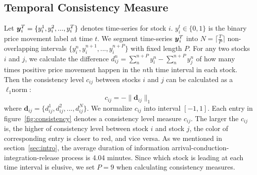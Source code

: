 \documentclass[sigconf,anonymous,review]{acmart}
\begin{document}
\subsection{Temporal Consistency Measure}

Let ${\boldsymbol{y}}_i^T=\{y_i^1,y_i^2,...,y_i^T\}$ denotes time-series for
stock $i$. $y_i^t\in \{0,1\}$ is the binary price movement label
at time $t$. We segment time-series ${\boldsymbol{y}}_i^T$ into
$N=\lceil\frac{T}{P}\rceil$ non-overlapping intervals
$\{y_i^n,y_i^{n+1},...,y_i^{n+P}\}$ with fixed length $P$. For
any two stocks $i$ and $j$, we calculate the difference
$d_{ij}^n=\sum_n^{n+P}{y_i^n}-\sum_n^{n+P}{y_j^n}$ of how many
times positive price movement happen in the $n$th time interval
in each stock. Then the consistency level $c_{ij}$ between stocks
$i$ and $j$ can be calculated as a $\ell_1\text{norm}$:
$$c_{ij}=-\|\mathbf{d}_{ij}\|_1$$
\noindent where
$\mathbf{d}_{ij}=\{d_{ij}^1,d_{ij}^2,...,d_{ij}^N\}$. We
normalize $c_{ij}$ into interval $[-1,1]$. Each entry in
figure~\ref{fig:consistency} denotes a consistency level measure
$c_{ij}$. The larger the $c_{ij}$ is, the higher of consistency
level between stock $i$ and stock $j$, the color of corresponding
entry is closer to red, and vice versa. As we mentioned in
section~\ref{sec:intro}, the average duration of information
arrival-conduction-integration-release process is 4.04 minutes.
Since which stock is leading at each time interval is elusive, we
set $P=9$ when calculating consistency measures.


\end{document}
